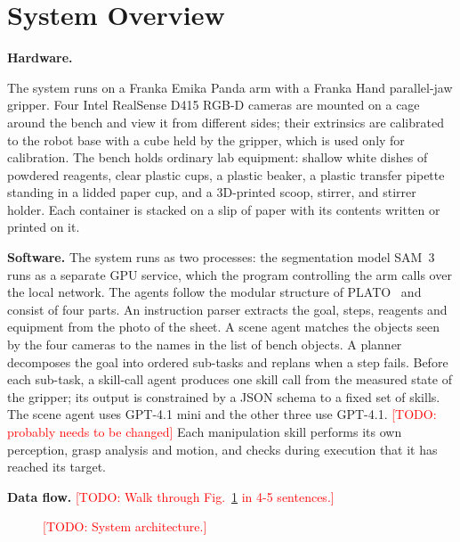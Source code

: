 \documentclass[letterpaper, 10pt, journal, twoside]{IEEEtran}}
\newcommand{\todo}[1]{\textcolor{red}{[TODO: #1]}}
\newcommand{\placeholderfig}[3]{%
  \fbox{\parbox[c][#2][c]{#1}{\centering\footnotesize\textcolor{gray}{#3}}}}
\begin{document}
\section{System Overview}
\label{sec:overview}

\textbf{Hardware.} 

The system runs on a Franka Emika Panda arm with a Franka Hand
parallel-jaw gripper. Four Intel RealSense D415 RGB-D cameras are mounted
on a cage around the bench and view it from different sides; their
extrinsics are calibrated to the robot base with a cube held by the gripper,
which is used only for calibration. The bench holds ordinary lab equipment:
shallow white dishes of powdered reagents, clear plastic cups, a plastic
beaker, a plastic transfer pipette standing in a lidded paper cup, and a
3D-printed scoop, stirrer, and stirrer holder. Each container is stacked on a
slip of paper with its contents written or printed on it.

\textbf{Software.} 
The system runs as two processes: the segmentation model
SAM~3~\cite{carion2026sam3} runs as a separate GPU service, which the
program controlling the arm calls over the local network. The agents follow
the modular structure of PLATO~\cite{car2026plato} and consist of four
parts. An instruction parser extracts the goal, steps, reagents and
equipment from the photo of the sheet. A scene agent matches the objects
seen by the four cameras to the names in the list of bench objects. A
planner decomposes the goal into ordered sub-tasks and replans when a step
fails. Before each sub-task, a skill-call agent produces one skill call from
the measured state of the gripper; its output is constrained by a JSON
schema to a fixed set of skills. The scene agent uses GPT-4.1 mini and the
other three use GPT-4.1. \todo{probably needs to be changed}
Each manipulation skill performs its own perception, grasp
analysis and motion, and checks during execution that it has reached its
target.

\textbf{Data flow.} \todo{Walk through Fig.~\ref{fig:architecture} in 4-5
sentences.}

\begin{figure}[t]
  \centering
  \placeholderfig{0.95\textwidth}{5.0cm}{Architecture: instruction image
  $\rightarrow$ scene agent $\rightarrow$ planner $\rightarrow$ skill-call
  agent $\rightarrow$ skills (perception + motion) $\rightarrow$ checks
  $\rightarrow$ report; sim twin shown alongside}
  \caption{\todo{System architecture.}}
  \label{fig:architecture}
\end{figure}
\end{document}
